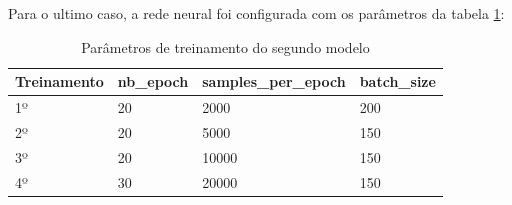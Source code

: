 	\begin{figure}[H]
		\centering
\end{figure}

Para o ultimo caso, a rede neural foi configurada com os parâmetros da tabela \ref{tabela2}:

\begin{table}[H]
\centering
\caption{Parâmetros de treinamento do segundo modelo}
\label{tabela2}
\begin{tabular}{|l|l|l|l|}
\hline
\textbf{Treinamento} & \textbf{nb\_epoch} & \textbf{samples\_per\_epoch} & \textbf{batch\_size} \\ \hline
1º        & 20        & 2000                & 200         \\
2º        & 20        & 5000                & 150         \\
3º        & 20        & 10000               & 150         \\
4º        & 30        & 20000               & 150         \\ \hline
\end{tabular}
\end{table}

